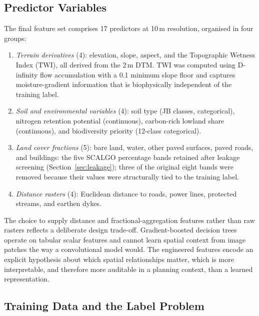 \documentclass[land,article,submit,moreauthors]{Definitions/mdpi}
\begin{document}
\subsection{Predictor Variables}
\label{sec:predictors}

The final feature set comprises 17 predictors at 10\,m resolution, organised in four groups:

\begin{enumerate}
    \item \textit{Terrain derivatives} (4): elevation, slope, aspect, and the Topographic Wetness Index (TWI), all derived from the 2\,m DTM. TWI was computed using D-infinity flow accumulation with a 0.1\textdegree{} minimum slope floor and captures moisture-gradient information that is biophysically independent of the training label.

    \item \textit{Soil and environmental variables} (4): soil type (JB classes, categorical), nitrogen retention potential (continuous), carbon-rich lowland share (continuous), and biodiversity priority (12-class categorical).

    \item \textit{Land cover fractions} (5): bare land, water, other paved surfaces, paved roads, and buildings: the five SCALGO percentage bands retained after leakage screening (Section~\ref{sec:leakage}); three of the original eight bands were removed because their values were structurally tied to the training label.

    \item \textit{Distance rasters} (4): Euclidean distance to roads, power lines, protected streams, and earthen dykes.
\end{enumerate}

The choice to supply distance and fractional-aggregation features rather than raw rasters reflects a deliberate design trade-off. Gradient-boosted decision trees operate on tabular scalar features and cannot learn spatial context from image patches the way a convolutional model would. The engineered features encode an explicit hypothesis about which spatial relationships matter, which is more interpretable, and therefore more auditable in a planning context, than a learned representation.

\subsection{Training Data and the Label Problem}
\label{sec:labels}
\end{document}

